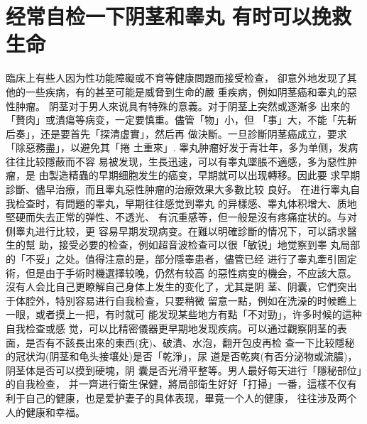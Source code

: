 \documentclass[12pt,UTF8]{ctexbook}
\begin{document}
\section{经常自检一下阴茎和睾丸
有时可以挽救生命}
臨床上有些人因为性功能障礙或不育等健康問題而接受检查，
卻意外地发现了其他的一些疾病，有的甚至可能是威脅到生命的嚴
重疾病，例如阴茎癌和睾丸的惡性肿瘤。
阴茎对于男人來说具有特殊的意義。对于阴茎上突然或逐漸多
出來的「贅肉」或潰瘍等病变，一定要慎重。儘管「物」小，但
「事」大，不能「先斬后奏」，还是要首先「探清虚實」，然后再
做決斷。一旦診斷阴茎癌成立，要求「除惡務盡」，以避免其「捲
土重來」.
睾丸肿瘤好发于青壮年，多为单侧，发病往往比较隱蔽而不容
易被发现，生長迅速，可以有睾丸墜脹不適感，多为惡性肿瘤，是
由製造精蟲的早期细胞发生的癌变，早期就可以出现轉移。因此要
求早期診斷、儘早治療，而且睾丸惡性肿瘤的治療效果大多數比较
良好。
在进行睾丸自我检查时，有問題的睾丸，早期往往感觉到睾丸
的异樣感、睾丸体积增大、质地堅硬而失去正常的弹性、不透光、
有沉重感等，但一般是沒有疼痛症状的。与对侧睾丸进行比较，更
容易早期发现病变。在難以明確診斷的情况下，可以請求醫生的幫
助，接受必要的检查，例如超音波检查可以很「敏锐」地觉察到睾
丸局部的「不妥」之处。值得注意的是，部分隱睾患者，儘管已经
进行了睾丸牽引固定術，但是由于手術时機選擇较晚，仍然有较高
的惡性病变的機会，不应該大意。
沒有人会比自己更瞭解自己身体上发生的变化了，尤其是阴
茎、阴囊，它們突出于体腔外，特別容易进行自我检查，只要稍微
留意一點，例如在洗澡的时候瞧上一眼，或者摸上一把，有时就可
能发现某些地方有點「不对勁」，许多时候的這种自我检查或感
觉，可以比精密儀器更早期地发现疾病。可以通过觀察阴茎的表
面，是否有不該長出來的東西(疣)、破潰、水泡，翻开包皮再检
查一下比较隱秘的冠状沟(阴茎和龟头接壤处)是否「乾淨」，尿
道是否乾爽(有否分泌物或流膿)，阴茎体是否可以摸到硬塊，阴
囊是否光滑平整等。男人最好每天进行「隱秘部位」的自我检查，
并一齊进行衛生保健，將局部衛生好好「打掃」一番，這樣不仅有
利于自己的健康，也是爱护妻子的具体表现，畢竟一个人的健康，
往往涉及两个人的健康和幸福。
\end{document}
